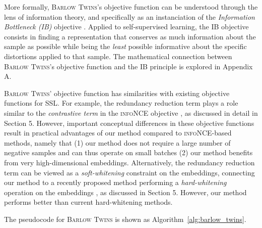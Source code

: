 \documentclass{article}
\newcommand{\AlgoName}{\textsc{Barlow Twins}}
\begin{document}
More formally, \AlgoName{}'s objective function can be understood through the lens of information theory, and specifically as an instanciation of the \emph{Information Bottleneck (IB)} objective \cite{tishby_deep_2015,tishby_information_2000}. Applied to self-supervised learning, the IB objective consists in finding a representation that conserves as much information about the sample as possible while being the \emph{least} possible informative about the specific distortions applied to that sample. The mathematical connection between \AlgoName{}'s objective function and the IB principle is explored in Appendix A.

\AlgoName{}' objective function has similarities with existing objective functions for SSL. For example, the redundancy reduction term plays a role similar to the \emph{contrastive term} in the \textsc{infoNCE} objective \cite{oord2018representation}, as discussed in detail in Section 5. However, important conceptual differences in these objective functions result in practical advantages of our method compared to \textsc{infoNCE}-based methods, namely that (1) our method does not require a large number of negative samples and can thus operate on small batches (2) our method benefits from very high-dimensional embeddings. Alternatively, the redundancy reduction term can be viewed as a \emph{soft-whitening} constraint on the embeddings, connecting our method to a recently proposed method performing a \emph{hard-whitening} operation on the embeddings \cite{ermolov_whitening_2020}, as discussed in Section 5. However, our method performs better than current hard-whitening methods.


The pseudocode for \AlgoName{} is shown as Algorithm~\ref{alg:barlow_twins}.
\end{document}
